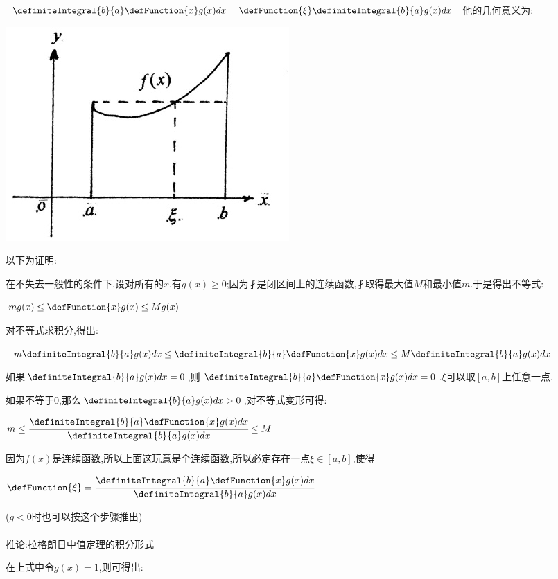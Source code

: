 {{{$\definiteIntegral{b}{a}\defFunction{x}g(x)dx = \defFunction{\xi}\definiteIntegral{b}{a}g(x)dx$
他的几何意义为:

\begin{center}
  \includegraphics{resources/Geometric_explanation_of_the_mean_value_theorem_for_integration.jpg}
\end{center}

以下为证明:

在不失去一般性的条件下,设对所有的$x$,有$g(x) \geq 0$;因为$\fint$是闭区间上的连续函数,$\fint$取得最大值$M$和最小值$m$.于是得出不等式:

$mg(x) \leq \defFunction{x}g(x) \leq Mg(x)$

对不等式求积分,得出:

$m\definiteIntegral{b}{a}g(x)dx \leq \definiteIntegral{b}{a}\defFunction{x}g(x)dx \leq M\definiteIntegral{b}{a}g(x)dx$

如果$\definiteIntegral{b}{a}g(x)dx = 0$,则$\definiteIntegral{b}{a}\defFunction{x}g(x)dx = 0$.$\xi$可以取$[a,b]$上任意一点.

如果不等于$0$,那么$\definiteIntegral{b}{a}g(x)dx>0$,对不等式变形可得:

$m \leq \cfrac{\definiteIntegral{b}{a}\defFunction{x}g(x)dx}{\definiteIntegral{b}{a}g(x)dx} \leq M$

因为$f(x)$是连续函数,所以上面这玩意是个连续函数,所以必定存在一点$\xi\in[a,b]$,使得

$\defFunction{\xi} = \cfrac{\definiteIntegral{b}{a}\defFunction{x}g(x)dx}{\definiteIntegral{b}{a}g(x)dx}$

($g<0$时也可以按这个步骤推出)
\\\\
推论:拉格朗日中值定理的积分形式

在上式中令$g(x) = 1$,则可得出:

}}}
